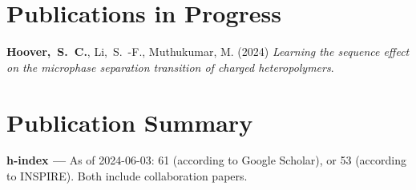 \newcommand{\arxiv}[1]{[\href{http://arxiv.org/abs/#1}{arXiv:#1}]}
\def\zero{0}
\def\one{1}
\newcommand{\citeCount}[1]{%
	\def\val{#1}
	\ifx\val\zero%
	\else%
		\ifx\val\one%
			(1~citation)%
		\else%
			(#1~citations)%
		\fi%
	\fi}

\renewcommand{\citeCount}[1]{}


\setcounter{numPubs}{3}
\setcounter{pubCounter}{\value{numPubs}}

\section{\sc Publications in Progress}
\begin{etaremune}[start=\value{pubCounter}]
	\item
	      {\bf Hoover,~S.~C.},
	Li,~S.~-F.,
	Muthukumar, M.
	(2024)
	{\it Learning the sequence effect on the microphase separation transition of charged heteropolymers}.
	\setcounter{pubCounter}{\value{enumi}}
\end{etaremune}

\newif\ifshowpubsummary
\ifshowpubsummary
	\section{\sc Publication Summary}
	 {\bf h-index ---}%
	As of 2024-06-03: 61 (according to Google Scholar), or 53 (according
	to INSPIRE).  Both include collaboration papers.

